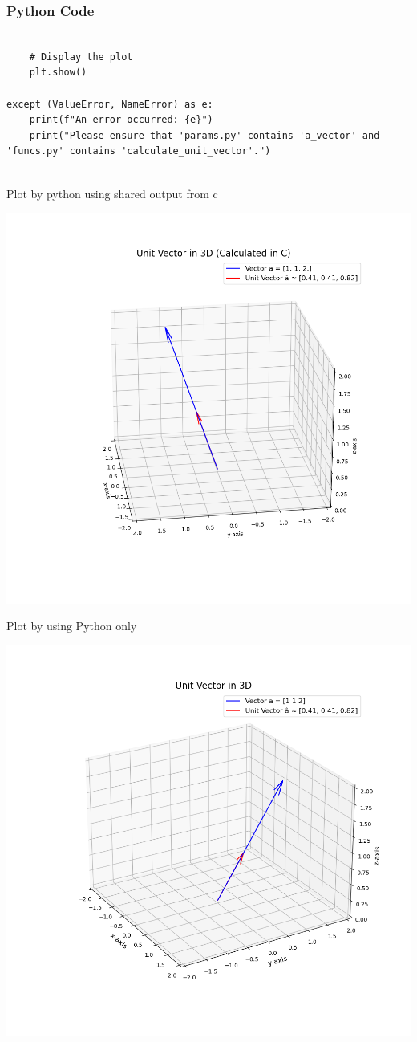 \documentclass{beamer}
\begin{document}
\begin{frame}[fragile]
\frametitle{Python Code}
\begin{lstlisting}

    # Display the plot
    plt.show()

except (ValueError, NameError) as e:
    print(f"An error occurred: {e}")
    print("Please ensure that 'params.py' contains 'a_vector' and 'funcs.py' contains 'calculate_unit_vector'.")


\end{lstlisting}
\end{frame}

\begin{frame}{Plot by python using shared output from c}
	\begin{center}
		\includegraphics[width=0.6\columnwidth]{figs/Figure.png}
	\end{center}
\end{frame}
\begin{frame}{Plot by using Python only}
	\begin{center}
		\includegraphics[width=0.6\columnwidth]{figs/Figure_1.png}
	\end{center}
\end{frame}
\end{document}
